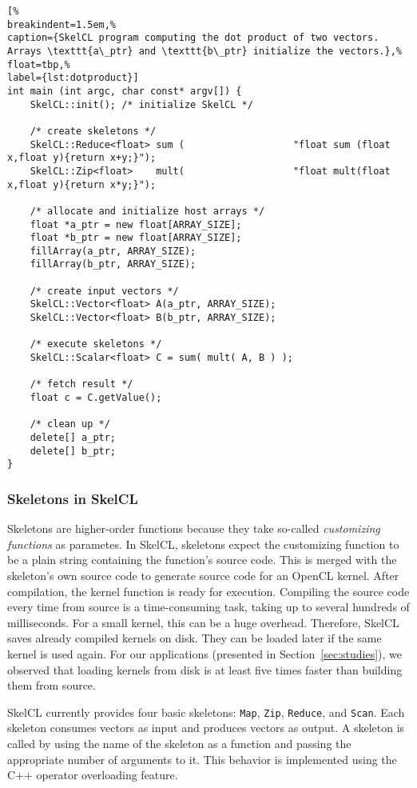 \begin{lstlisting}[%
breakindent=1.5em,%
caption={SkelCL program computing the dot product of two vectors. Arrays \texttt{a\_ptr} and \texttt{b\_ptr} initialize the vectors.},%
float=tbp,%
label={lst:dotproduct}]
int main (int argc, char const* argv[]) {
    SkelCL::init(); /* initialize SkelCL */

    /* create skeletons */
    SkelCL::Reduce<float> sum (                   "float sum (float x,float y){return x+y;}");
    SkelCL::Zip<float>    mult(                   "float mult(float x,float y){return x*y;}");

    /* allocate and initialize host arrays */
    float *a_ptr = new float[ARRAY_SIZE];
    float *b_ptr = new float[ARRAY_SIZE];
    fillArray(a_ptr, ARRAY_SIZE);
    fillArray(b_ptr, ARRAY_SIZE);

    /* create input vectors */
    SkelCL::Vector<float> A(a_ptr, ARRAY_SIZE);
    SkelCL::Vector<float> B(b_ptr, ARRAY_SIZE);

    /* execute skeletons */
    SkelCL::Scalar<float> C = sum( mult( A, B ) );

    /* fetch result */
    float c = C.getValue();
    
    /* clean up */
    delete[] a_ptr;
    delete[] b_ptr;
}
\end{lstlisting}


\subsubsection{Skeletons in SkelCL}

Skeletons are higher-order functions because they take so-called \emph{customizing functions} as parametes.
In SkelCL, skeletons expect the customizing function to be a plain string containing the function's source code.
This is merged with the skeleton's own source code to generate source code for an OpenCL kernel.
After compilation, the kernel function is ready for execution.
Compiling the source code every time from source is a time-consuming task, taking up to several hundreds of milliseconds.
For a small kernel, this can be a huge overhead.
Therefore, SkelCL saves already compiled kernels on disk.
They can be loaded later if the same kernel is used again.
For our applications (presented in Section~\ref{sec:studies}), we observed that loading kernels from disk is at least five times faster than building them from source.

SkelCL currently provides four basic skeletons: \texttt{Map}, \texttt{Zip}, \texttt{Reduce}, and \texttt{Scan}.
Each skeleton consumes vectors as input and produces vectors as output.
A skeleton is called by using the name of the skeleton as a function and passing the appropriate number of arguments to it.
This behavior is implemented using the C++ operator overloading feature.

